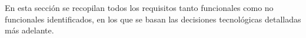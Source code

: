 
En esta sección se recopilan todos los requisitos tanto funcionales como no funcionales identificados, en los que se basan las decisiones tecnológicas detalladas más adelante.
